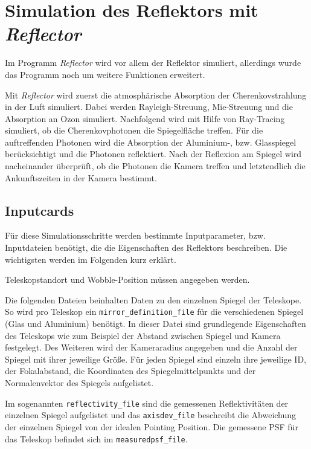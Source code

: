 \section{Simulation des Reflektors mit \textit{Reflector}}
\label{sec:Reflector}
Im Programm \textit{Reflector}\cite{Reflector} wird vor allem der Reflektor simuliert, allerdings wurde das Programm noch um weitere Funktionen erweitert.

Mit \textit{Reflector} wird zuerst die atmosphärische Absorption der Cherenkovstrahlung in der Luft simuliert. 
Dabei werden Rayleigh-Streuung, Mie-Streuung und die Absorption an Ozon simuliert.
Nachfolgend wird mit Hilfe von Ray-Tracing simuliert, ob die Cherenkovphotonen die Spiegelfläche treffen.
Für die auftreffenden Photonen wird die Absorption der Aluminium-, bzw. Glasspiegel berücksichtigt und die Photonen reflektiert.
Nach der Reflexion am Spiegel wird nacheinander überprüft, ob die Photonen die Kamera treffen und letztendlich die Ankunftszeiten in der Kamera bestimmt.

\subsection{Inputcards}
Für diese Simulationsschritte werden bestimmte Inputparameter, bzw. Inputdateien benötigt, die die Eigenschaften des Reflektors beschreiben.
Die wichtigsten werden im Folgenden kurz erklärt.


Teleskopstandort und Wobble-Position müssen angegeben werden.

Die folgenden Dateien beinhalten Daten zu den einzelnen Spiegel der Teleskope.
So wird pro Teleskop ein \texttt{mirror\_definition\_file} für die verschiedenen Spiegel (Glas und Aluminium) benötigt.
In dieser Datei sind grundlegende Eigenschaften des Teleskops wie zum Beispiel der Abstand zwischen Spiegel und Kamera festgelegt. 
Des Weiteren wird der Kameraradius angegeben und die Anzahl der Spiegel mit ihrer jeweilige Größe.
Für jeden Spiegel sind einzeln ihre jeweilige ID, der Fokalabstand, die Koordinaten des Spiegelmittelpunkts und der Normalenvektor des Spiegels aufgelistet.

Im sogenannten \texttt{reflectivity\_file} sind die gemessenen Reflektivitäten der einzelnen Spiegel aufgelistet und das \texttt{axisdev\_file} beschreibt die Abweichung der einzelnen Spiegel von der idealen Pointing Position.
Die gemessene PSF für das Teleskop befindet sich im \texttt{measuredpsf\_file}.

